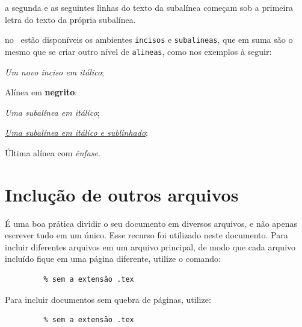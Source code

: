 \begin{alineas}
\begin{alineas}
     \item a segunda e as seguintes linhas do texto da subalínea começam sob a
     primeira letra do texto da própria subalínea.
  \end{alineas}
  
  \item no \abnTeX\ estão disponíveis os ambientes \texttt{incisos} e
  \texttt{subalineas}, que em suma são o mesmo que se criar outro nível de
  \texttt{alineas}, como nos exemplos à seguir:
  
  \begin{incisos}
    \item \textit{Um novo inciso em itálico};
  \end{incisos}
  
  \item Alínea em \textbf{negrito}:
  
  \begin{subalineas}
    \item \textit{Uma subalínea em itálico};
    \item \underline{\textit{Uma subalínea em itálico e sublinhado}}; 
  \end{subalineas}
  
  \item Última alínea com \emph{ênfase}.
  
\end{alineas}


\section{Inclução de outros arquivos}\label{sec-include}

É uma boa prática dividir o seu documento em diversos arquivos, e não
apenas escrever tudo em um único. Esse recurso foi utilizado neste
documento. Para incluir diferentes arquivos em um arquivo principal,
de modo que cada arquivo incluído fique em uma página diferente, utilize o
comando:

\begin{verbatim}
         % sem a extensão .tex
\end{verbatim}

Para incluir documentos sem quebra de páginas, utilize:

\begin{verbatim}
         % sem a extensão .tex
\end{verbatim}

